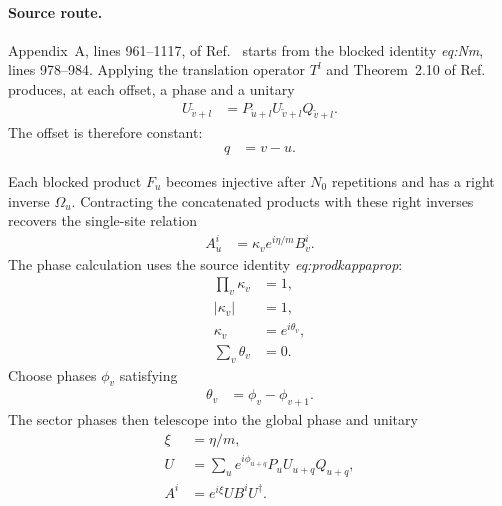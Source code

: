 \documentclass{article}
\begin{document}
\paragraph{Source route.}

Appendix~A, lines 961--1117, of
Ref.~\cite{DeLasCuevas2017Irreducible} starts from the blocked identity
\emph{eq:Nm}, lines 978--984. Applying the translation operator $T^l$ and
Theorem~2.10 of Ref.~\cite{Cirac2016MPDO} produces, at each
 offset, a phase
and a unitary
\begin{align}
    U_{\widetilde v+l}
    &=P_{\widetilde u+l}U_{\widetilde v+l}Q_{\widetilde v+l}.
    \label{eq:dccsp17_periodic_overlap_route_alignment_offset_unitary}
\end{align}
The offset is therefore constant:
\begin{align}
    q
    &=v-u.
    \label{eq:dccsp17_periodic_overlap_route_alignment_constant_offset}
\end{align}

Each blocked product $F_u$ becomes injective after $N_0$ repetitions and has a
right inverse $\Omega_u$. Contracting the concatenated products with these
right inverses recovers the single-site relation
\begin{align}
    A_u^i
    &=\kappa_v e^{i\eta/m}B_v^i.
    \label{eq:dccsp17_periodic_overlap_route_alignment_site_proportionality}
\end{align}
The phase calculation uses the source identity \emph{eq:prodkappaprop}:
\begin{align}
    \prod_v\kappa_v
    &=1,
    \label{eq:dccsp17_periodic_overlap_route_alignment_kappa_product}\\
    |\kappa_v|
    &=1,
    \label{eq:dccsp17_periodic_overlap_route_alignment_kappa_unit_modulus}\\
    \kappa_v
    &=e^{i\theta_v},
    \label{eq:dccsp17_periodic_overlap_route_alignment_kappa_phase}\\
    \sum_v\theta_v
    &=0.
    \label{eq:dccsp17_periodic_overlap_route_alignment_theta_sum}
\end{align}
Choose phases $\phi_v$ satisfying
\begin{align}
    \theta_v
    &=\phi_v-\phi_{v+1}.
    \label{eq:dccsp17_periodic_overlap_route_alignment_phase_coboundary}
\end{align}
The sector phases then telescope into the global phase and unitary
\begin{align}
    \xi
    &=\eta/m,
    \label{eq:dccsp17_periodic_overlap_route_alignment_global_phase}\\
    U
    &=\sum_u
      e^{i\phi_{u+q}}P_uU_{u+q}Q_{u+q},
    \label{eq:dccsp17_periodic_overlap_route_alignment_global_unitary}\\
    A^i
    &=e^{i\xi}UB^iU^\dagger.
    \label{eq:dccsp17_periodic_overlap_route_alignment_global_gauge}
\end{align}
\end{document}
